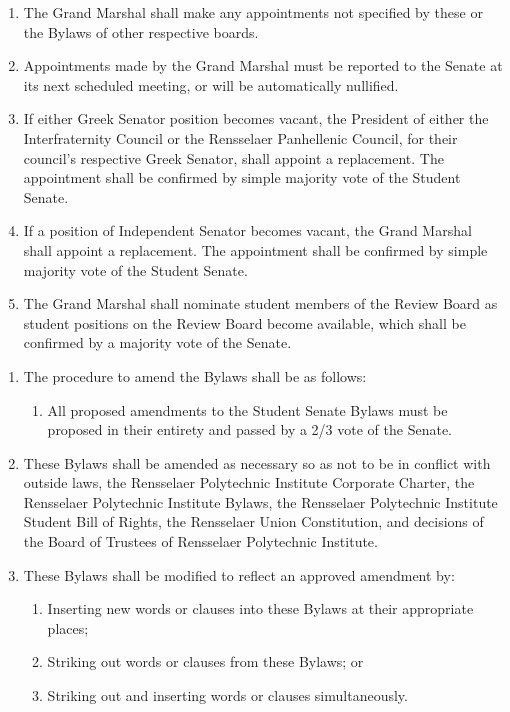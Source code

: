 \documentclass{uniondoc}
\begin{document}

\begin{enumerate}
	\item The Grand Marshal shall make any appointments not specified by these or the Bylaws of other respective boards.
	\item Appointments made by the Grand Marshal must be reported to the Senate at its next scheduled meeting,
	      or will be automatically nullified.
	\item If either Greek Senator position becomes vacant, the President of either the Interfraternity Council or the Rensselaer Panhellenic Council, for their council’s respective Greek Senator, shall appoint a replacement.
	      The appointment shall be confirmed by simple majority vote of the Student Senate.
	\item If a position of Independent Senator becomes vacant, the Grand Marshal shall appoint a replacement.
	      The appointment shall be confirmed by simple majority vote of the Student Senate.
	\item The Grand Marshal shall nominate student members of the Review Board as student positions on the Review Board become available, which shall be confirmed by a majority vote of the Senate.
\end{enumerate}


\begin{enumerate}
	\item The procedure to amend the Bylaws shall be as follows:
	      \begin{enumerate}
		      \item All proposed amendments to the Student Senate Bylaws must be proposed in their entirety and passed by a 2/3 vote of the Senate.
	      \end{enumerate}
	\item These Bylaws shall be amended as necessary so as not to be in conflict with outside laws, the Rensselaer Polytechnic Institute Corporate Charter, the Rensselaer Polytechnic Institute Bylaws, the Rensselaer Polytechnic Institute Student Bill of Rights, the Rensselaer Union Constitution, and decisions of the Board of Trustees of Rensselaer Polytechnic Institute.
	\item These Bylaws shall be modified to reflect an approved amendment by:
	      \begin{enumerate}
		      \item Inserting new words or clauses into these Bylaws at their appropriate places;
		      \item Striking out words or clauses from these Bylaws; or
		      \item Striking out and inserting words or clauses simultaneously.
	      \end{enumerate}
\end{enumerate}
\end{document}
